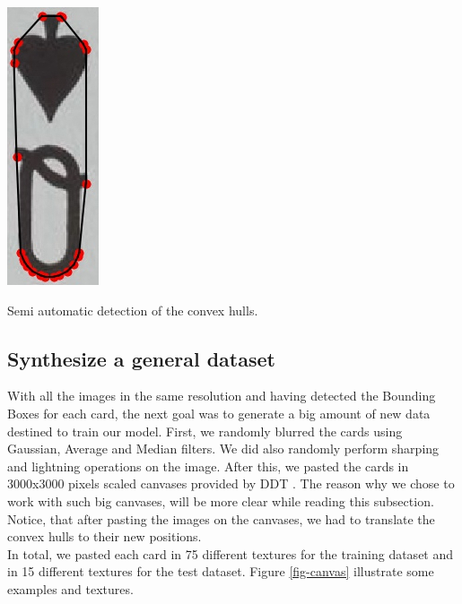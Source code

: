 \documentclass[a4paper]{article}
\begin{document}
\begin{minipage}{\columnwidth}
{\includegraphics[scale=0.74]{qs_2_2}  }
\caption{Semi automatic detection of the convex hulls.}
\label{fig-data-prep}
\end{minipage}

\subsection{Synthesize a general dataset}
With all the images in the same resolution and having detected the Bounding Boxes for each card, the next goal was to generate a big amount of new data destined to train our model. 
First, we randomly blurred the cards using Gaussian, Average and Median filters.  We did also randomly perform sharping and lightning operations on the image.  After this, we pasted the cards in 3000x3000 pixels scaled canvases provided by DDT \cite{cimpoi14describing}.  The reason why we chose to work with such big canvases, will be more clear while reading this subsection.  Notice, that after pasting the images on the canvases, we had to translate the convex hulls to their new positions.\\
In total, we pasted each card in 75 different textures for the training dataset and in 15 different textures for the test dataset.  Figure \ref{fig-canvas} illustrate some examples and textures.
\end{document}
